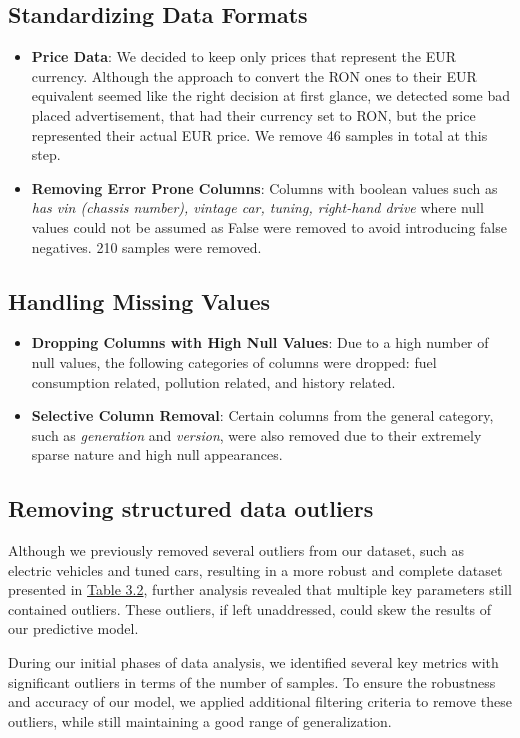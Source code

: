 \subsection{Standardizing Data Formats}
\begin{itemize}
    \item \textbf{Price Data}: We decided to keep only prices that represent the EUR currency. Although the approach to convert the RON ones to their EUR equivalent seemed like the right decision at first glance, we detected some bad placed advertisement, that had their currency set to RON, but the price represented their actual EUR price. We remove 46 samples in total at this step.
    \item \textbf{Removing Error Prone Columns}: Columns with boolean values such as \textit{has vin (chassis number), vintage car, tuning, right-hand drive} where null values could not be assumed as False were removed to avoid introducing false negatives. 210 samples were removed.
\end{itemize}

\subsection{Handling Missing Values}
\begin{itemize}
    \item \textbf{Dropping Columns with High Null Values}: Due to a high number of null values, the following categories of columns were dropped: fuel consumption related, pollution related, and history related.
    \item \textbf{Selective Column Removal}: Certain columns from the general category, such as \textit{generation} and \textit{version}, were also removed due to their extremely sparse nature and high null appearances.
\end{itemize}

\subsection{Removing structured data outliers}
Although we previously removed several outliers from our dataset, such as electric vehicles and tuned cars, resulting in a more robust and complete dataset presented in \hyperref[tab:cleaned-table]{Table 3.2}, further analysis revealed that multiple key parameters still contained outliers. These outliers, if left unaddressed, could skew the results of our predictive model.

During our initial phases of data analysis, we identified several key metrics with significant outliers in terms of the number of samples. To ensure the robustness and accuracy of our model, we applied additional filtering criteria to remove these outliers, while still maintaining a good range of generalization.

